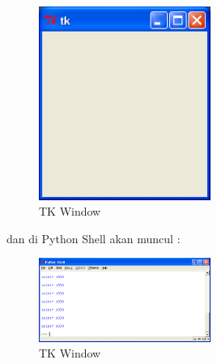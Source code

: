 \begin{enumerate}
			\begin{figure}[ht]
			\centerline{\includegraphics[width=0.5\textwidth]{figures/tkser.png}}
			\caption{TK Window}
			\label{tkser}
			\end{figure}
			
			dan di Python Shell akan muncul :
			
			\begin{figure}[ht]
			\centerline{\includegraphics[width=0.5\textwidth]{figures/tkpython.png}}
			\caption{TK Window}
			\label{tkpython}
			\end{figure}
			
		\end{enumerate}
		

